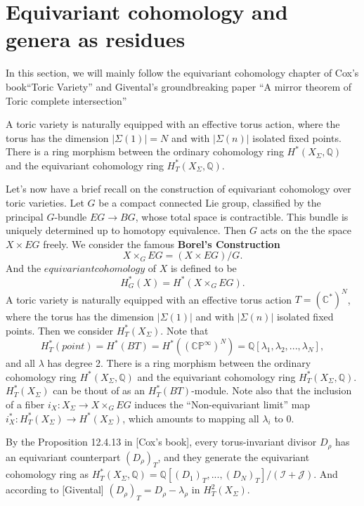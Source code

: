 \documentclass[11pt]{article}
\begin{document}
\section{Equivariant cohomology and genera as residues}
In this section, we will mainly follow the equivariant cohomology chapter of Cox's book``Toric Variety'' and Givental's groundbreaking paper ``A mirror theorem of Toric complete intersection''

A toric variety is naturally equipped with an effective torus action, where the torus has the dimension $|\Sigma(1)|=N$ and with $|\Sigma(n)|$ isolated fixed points. There is a ring morphism between the ordinary cohomology ring $H^*(X_{\Sigma},\mathbb{Q})$ and the equivariant cohomology ring $H_{T}^{*}(X_{\Sigma},\mathbb{Q})$.  

Let's now have a brief recall on the construction of equivariant cohomology over toric varieties. Let $G$ be a compact connected Lie group, classified by  the principal $G$-bundle $EG\rightarrow BG$, whose total space is contractible. This bundle is uniquely determined up to homotopy equivalence. Then $G$ acts on the the space$X\times EG$ freely. We consider the famous \textbf{Borel's Construction}
\begin{equation}
	X\times_G EG=(X\times EG)/G.
\end{equation}
And the $equivariant cohomology$ of $X$ is defined to be 
\begin{equation}
	H^*_{G}(X)=H^*(X\times_G EG).
\end{equation}
A toric variety is naturally equipped with an effective torus action $T=(\mathbb{C}^*)^N$, where the torus has the dimension $|\Sigma(1)|$ and with $|\Sigma(n)|$ isolated fixed points. Then we consider $H^*_T(X_\Sigma)$. Note that 
$$
H^*_T(point)=H^*(BT)=H^*((\mathbb{CP^\infty})^N)=\mathbb{Q}[\lambda_1,\lambda_2,...,\lambda_N ],
$$
and all $\lambda$ has degree 2.
There is a ring morphism between the ordinary cohomology ring $H^*(X_{\Sigma},\mathbb{Q})$ and the equivariant cohomology ring $H_{T}^{*}(X_{\Sigma},\mathbb{Q})$. $H^*_T(X_\Sigma)$ can be thout of as an $H^*_T(BT)$-module. Note also that the inclusion of a fiber $i_{X}: X_\Sigma\rightarrow X\times_G EG$ induces the ``Non-equivariant limit'' map $i^*_X: H^*_T(X_\Sigma)\rightarrow H^*(X_\Sigma)$, which amounts to mapping all $\lambda_i$ to 0.

By the Proposition 12.4.13 in [Cox's book], every torus-invariant divisor $D_\rho$ has an equivariant counterpart $(D_\rho)_T$, and they generate the equivariant cohomology ring as
$H^*_T(X_\Sigma,\mathbb{Q})=\mathbb{Q}[(D_1)_T,...,(D_N)_T]/(\mathcal{I+J})$.
And according to [Givental] $(D_\rho)_T=D_\rho -\lambda_\rho$ in $H^2_T(X_\Sigma)$.
\end{document}
